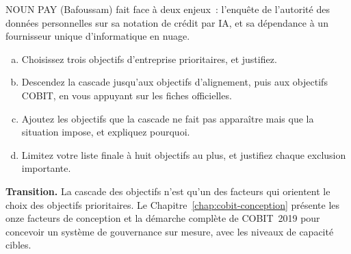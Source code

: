 \begin{boxexo}[title={\ding{45}\quad Exercice~6.3. Les priorités de NOUN PAY \niveauexpert}]
NOUN PAY (Bafoussam) fait face à deux enjeux~: l'enquête de l'autorité des
données personnelles sur sa notation de crédit par IA, et sa dépendance à
un fournisseur unique d'informatique en nuage.
\begin{enumerate}[(a)]
    \item Choisissez trois objectifs d'entreprise prioritaires, et
          justifiez.
    \item Descendez la cascade jusqu'aux objectifs d'alignement, puis aux
          objectifs COBIT, en vous appuyant sur les fiches officielles.
    \item Ajoutez les objectifs que la cascade ne fait pas apparaître mais
          que la situation impose, et expliquez pourquoi.
    \item Limitez votre liste finale à huit objectifs au plus, et
          justifiez chaque exclusion importante.
\end{enumerate}
\end{boxexo}

\bigskip

\begin{boxinfo}
\textbf{Transition.} La cascade des objectifs n'est qu'un des facteurs qui
orientent le choix des objectifs prioritaires. Le
Chapitre~\ref{chap:cobit-conception} présente les onze facteurs de
conception et la démarche complète de COBIT~2019 pour concevoir un
système de gouvernance sur mesure, avec les niveaux de capacité cibles.
\end{boxinfo}
